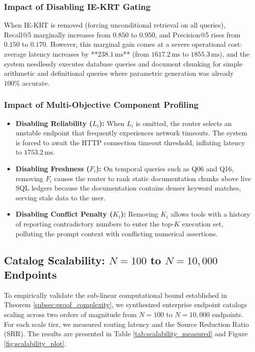 \subsubsection{Impact of Disabling IE-KRT Gating}
When IE-KRT is removed (forcing unconditional retrieval on all queries), Recall@5 marginally increases from $0.850$ to $0.950$, and Precision@5 rises from $0.150$ to $0.170$. However, this marginal gain comes at a severe operational cost: average latency increases by **$238.1\,\text{ms}$** (from $1617.2\,\text{ms}$ to $1855.3\,\text{ms}$), and the system needlessly executes database queries and document chunking for simple arithmetic and definitional queries where parametric generation was already $100\%$ accurate.

\subsubsection{Impact of Multi-Objective Component Profiling}
\begin{itemize}
    \item \textbf{Disabling Reliability ($L_i$):} When $L_i$ is omitted, the router selects an unstable endpoint that frequently experiences network timeouts. The system is forced to await the HTTP connection timeout threshold, inflating latency to $1753.2\,\text{ms}$.
    \item \textbf{Disabling Freshness ($F_i$):} On temporal queries such as Q06 and Q16, removing $F_i$ causes the router to rank static documentation chunks above live SQL ledgers because the documentation contains denser keyword matches, serving stale data to the user.
    \item \textbf{Disabling Conflict Penalty ($K_i$):} Removing $K_i$ allows tools with a history of reporting contradictory numbers to enter the top-$K$ execution set, polluting the prompt context with conflicting numerical assertions.
\end{itemize}

\subsection{Catalog Scalability: $N=100$ to $N=10,000$ Endpoints}
To empirically validate the sub-linear computational bound established in Theorem \ref{subsec:proof_complexity}, we synthesized enterprise endpoint catalogs scaling across two orders of magnitude from $N = 100$ to $N = 10,000$ endpoints. For each scale tier, we measured routing latency and the Source Reduction Ratio (SRR). The results are presented in Table \ref{tab:scalability_measured} and Figure \ref{fig:scalability_plot}.

